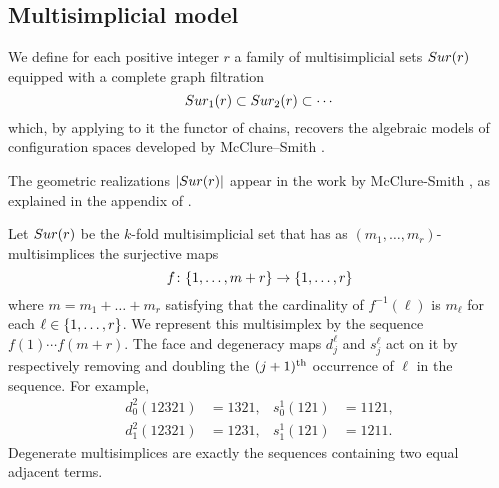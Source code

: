 \subsection{Multisimplicial model}\label{ss:surjection model}

We define for each positive integer $r$ a family of multisimplicial sets $Sur(r)$ equipped with a complete graph filtration
\[
 Sur_{1}(r) \subset Sur_{2}(r) \subset \dotsb
\]
which, by applying to it the functor of chains, recovers the algebraic models of configuration spaces developed by McClure--Smith \cite{mcluresmith2004geomodel}.

The geometric realizations $ \lvert Sur(r)\rvert$ appear in the work by McClure-Smith \cite{mcclure2003multivariable}, as explained in the appendix of \cite{salvatore2009deligne}.


Let $Sur(r)$ be the $k$-fold multisimplicial set that has as $(m_1,\dots,m_r)$-multisimplices
the surjective maps
\[
f \colon \{1,\dots,m+r\} \to \{1,\dots,r\}
\]
where $m = m_1+\dots+m_r$ satisfying that the cardinality of $f^{-1}(\ell)$ is $m_\ell$ for each $\ell \in \{1,\dots,r\}$.
We represent this multisimplex by the sequence $f(1) \dotsm f(m+r)$.
The face and degeneracy maps $d^\ell_j$ and $s^\ell_j$ act on it by respectively removing and doubling the $(j+1)^{\mathrm{th}}$ occurrence of $\ell$ in the sequence.
For example,
\begin{align*}
	d^2_0(12321)&=1321, & s^1_0(121)&=1121, \\
	d^2_1(12321)&=1231, & s^1_1(121)&=1211.
\end{align*}
Degenerate multisimplices are exactly the sequences containing two equal adjacent terms.
